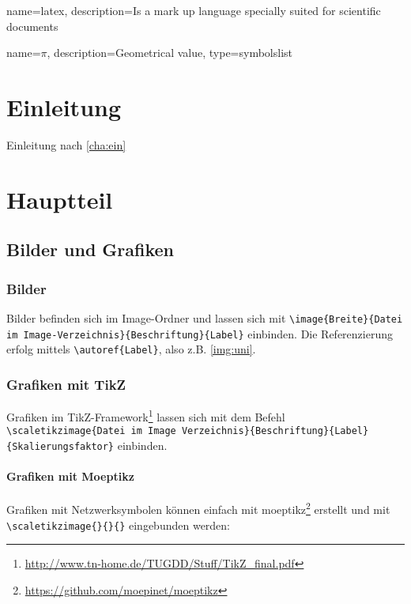 
{
        name=latex,
        description={Is a mark up language specially suited for scientific documents}
}

{
        name=\ensuremath{\pi},
        description={Geometrical value},
        type=symbolslist
}

\lstset{language=TeX}

\chapter{Einleitung}\label{cha:ein}
Einleitung nach \autoref{cha:ein}

\chapter{Hauptteil}\label{cha:haupt}
\section{Bilder und Grafiken}\label{sec:grafiken}

\subsection{Bilder}\label{subsec:bilder}
Bilder befinden sich im Image-Ordner und lassen sich mit \lstinline|\image{Breite}{Datei im Image-Verzeichnis}{Beschriftung}{Label}| einbinden.  Die Referenzierung erfolg mittels \lstinline|\autoref{Label}|, also z.B. \autoref{img:uni}.

\subsection{Grafiken mit TikZ}
Grafiken im TikZ-Framework\footnote{\url{http://www.tn-home.de/TUGDD/Stuff/TikZ_final.pdf}} lassen sich mit dem Befehl \lstinline|\scaletikzimage{Datei im Image Verzeichnis}{Beschriftung}{Label}{Skalierungsfaktor}| einbinden. 

\subsubsection{Grafiken mit Moeptikz}
Grafiken mit Netzwerksymbolen können einfach mit moeptikz\footnote{\url{https://github.com/moepinet/moeptikz}} erstellt und mit \lstinline|\scaletikzimage{}{}{}| eingebunden werden:

